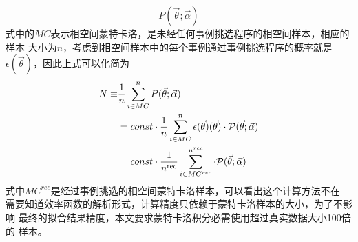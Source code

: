 \begin{itemize}
\begin{equation}
            P(\vec{\theta}; \vec{\alpha})
        \end{equation}
        式中的$MC$表示相空间蒙特卡洛，是未经任何事例挑选程序的相空间样本，相应的样本
        大小为$n$，考虑到相空间样本中的每个事例通过事例挑选程序的概率就是
        $\epsilon(\vec{\theta})$，因此上式可以化简为
        \begin{equation}
            \begin{aligned}
                \label{eq:cal-N}
                N \equiv& \frac{1}{n}  \sum_{i \in MC}^{n} 
                 P(\vec{\theta}; \vec{\alpha}) \\
                & = const \cdot \frac{1}{n} \sum_{i \in MC}^{n}
            \epsilon(\vec{\theta})(\vec{\theta})
                \cdot \mathcal{P}(\vec{\theta}; \vec{\alpha}) \\ 
                & = const \cdot \frac{1}{n^{\rm rec}} 
                \sum_{i \in MC^{rec}}^{n^{rec}}
                \cdot \mathcal{P}(\vec{\theta}; \vec{\alpha}) 
            \end{aligned}
        \end{equation}
        式中$MC^{rec}$是经过事例挑选的相空间蒙特卡洛样本，可以看出这个计算方法不在
        需要知道效率函数的解析形式，计算精度只依赖于蒙特卡洛样本的大小，为了不影响
        最终的拟合结果精度，本文要求蒙特卡洛积分必需使用超过真实数据大小100倍的
        样本。


\end{itemize}
